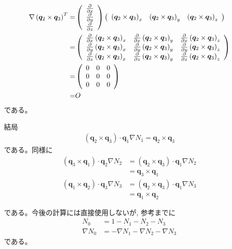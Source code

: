 \begin{align}
\nabla\left(\bm{q}_2\times\bm{q}_3\right)^T=&
\left(
\begin{array}{c}
\strut\frac{\partial}{\partial x}\\
\strut\frac{\partial}{\partial y}\\
\strut\frac{\partial}{\partial z}
\end{array}
\right)
\left(
\begin{array}{ccc}
\left(\bm{q}_2\times\bm{q}_3\right)_x &
\left(\bm{q}_2\times\bm{q}_3\right)_y &
\left(\bm{q}_2\times\bm{q}_3\right)_z
\end{array}
\right)\\
=&
\left(
\begin{array}{ccc}
\strut
\frac{\partial}{\partial x} \left(\bm{q}_2\times\bm{q}_3\right)_x &
\frac{\partial}{\partial x} \left(\bm{q}_2\times\bm{q}_3\right)_y &
\frac{\partial}{\partial x} \left(\bm{q}_2\times\bm{q}_3\right)_z \\
\strut
\frac{\partial}{\partial y} \left(\bm{q}_2\times\bm{q}_3\right)_x &
\frac{\partial}{\partial y} \left(\bm{q}_2\times\bm{q}_3\right)_y &
\frac{\partial}{\partial y} \left(\bm{q}_2\times\bm{q}_3\right)_z \\
\strut
\frac{\partial}{\partial z} \left(\bm{q}_2\times\bm{q}_3\right)_x &
\frac{\partial}{\partial z} \left(\bm{q}_2\times\bm{q}_3\right)_y &
\frac{\partial}{\partial z} \left(\bm{q}_2\times\bm{q}_3\right)_z
\end{array}
\right)\\
=&
\left(
\begin{array}{ccc}
0 & 0 & 0 \\
0 & 0 & 0 \\
0 & 0 & 0
\end{array}
\right)\\
=&O
\end{align}
である。

結局
\begin{align}
\left(\bm{q}_2\times\bm{q}_3\right)\cdot\bm{q}_1\nabla N_1
=\bm{q}_2\times\bm{q}_3
\end{align}
である。同様に
\begin{align}
\left(\bm{q}_3\times\bm{q}_1\right)\cdot\bm{q}_2\nabla N_2
&=\left(\bm{q}_2\times\bm{q}_3\right)\cdot\bm{q}_1\nabla N_2\\
&=\bm{q}_3\times\bm{q}_1\\
\left(\bm{q}_1\times\bm{q}_2\right)\cdot\bm{q}_3\nabla N_3
&=\left(\bm{q}_2\times\bm{q}_3\right)\cdot\bm{q}_1\nabla N_3\\
&=\bm{q}_1\times\bm{q}_2
\end{align}

である。今後の計算には直接使用しないが, 参考までに
\begin{align}
N_0&=1-N_1-N_2-N_3\\
\nabla N_0&=-\nabla N_1-\nabla N_2-\nabla N_3
\end{align}
である。
